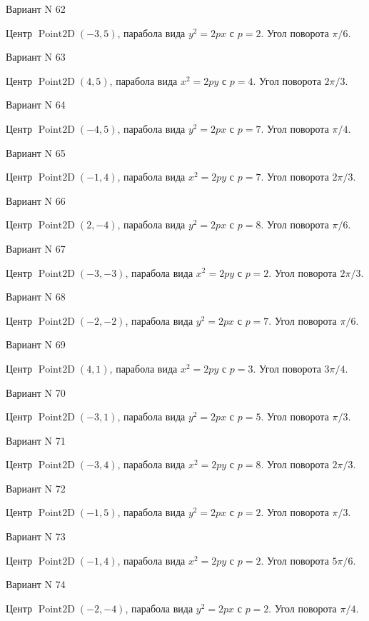 \documentclass[11pt]{report}
\begin{document}
Вариант N 62

Центр $\operatorname{Point2D}\left(-3, 5\right)$, парабола вида $y^{2} = 2px$ с $p = 2$. Угол поворота $\pi / 6$.

Вариант N 63

Центр $\operatorname{Point2D}\left(4, 5\right)$, парабола вида $x^{2} = 2py$ с $p = 4$. Угол поворота $2 \pi / 3$.

Вариант N 64

Центр $\operatorname{Point2D}\left(-4, 5\right)$, парабола вида $y^{2} = 2px$ с $p = 7$. Угол поворота $\pi / 4$.

Вариант N 65

Центр $\operatorname{Point2D}\left(-1, 4\right)$, парабола вида $x^{2} = 2py$ с $p = 7$. Угол поворота $2 \pi / 3$.

Вариант N 66

Центр $\operatorname{Point2D}\left(2, -4\right)$, парабола вида $y^{2} = 2px$ с $p = 8$. Угол поворота $\pi / 6$.

Вариант N 67

Центр $\operatorname{Point2D}\left(-3, -3\right)$, парабола вида $x^{2} = 2py$ с $p = 2$. Угол поворота $2 \pi / 3$.

Вариант N 68

Центр $\operatorname{Point2D}\left(-2, -2\right)$, парабола вида $y^{2} = 2px$ с $p = 7$. Угол поворота $\pi / 6$.

Вариант N 69

Центр $\operatorname{Point2D}\left(4, 1\right)$, парабола вида $x^{2} = 2py$ с $p = 3$. Угол поворота $3 \pi / 4$.

Вариант N 70

Центр $\operatorname{Point2D}\left(-3, 1\right)$, парабола вида $y^{2} = 2px$ с $p = 5$. Угол поворота $\pi / 3$.

Вариант N 71

Центр $\operatorname{Point2D}\left(-3, 4\right)$, парабола вида $x^{2} = 2py$ с $p = 8$. Угол поворота $2 \pi / 3$.

Вариант N 72

Центр $\operatorname{Point2D}\left(-1, 5\right)$, парабола вида $y^{2} = 2px$ с $p = 2$. Угол поворота $\pi / 3$.

Вариант N 73

Центр $\operatorname{Point2D}\left(-1, 4\right)$, парабола вида $x^{2} = 2py$ с $p = 2$. Угол поворота $5 \pi / 6$.

Вариант N 74

Центр $\operatorname{Point2D}\left(-2, -4\right)$, парабола вида $y^{2} = 2px$ с $p = 2$. Угол поворота $\pi / 4$.
\end{document}
